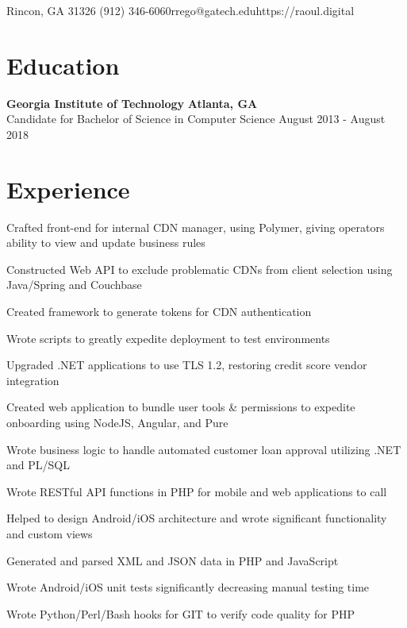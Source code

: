 \documentclass[line]{resume}
\begin{document}
\begin{center}
	 {Rincon, GA 31326} {(912) 346-6060}{rrego@gatech.edu}{https://raoul.digital}
\end{center}
\section{Education}
\textbf{Georgia Institute of Technology} \hfill \textbf{Atlanta, GA} \\
Candidate for Bachelor of Science in Computer Science  \hfill August 2013 - August 2018
\section{Experience}
\begin{myitemize}
	\item Crafted front-end for internal CDN manager, using Polymer, giving operators ability to view and update business rules
	\item Constructed Web API to exclude problematic CDNs from client selection using Java/Spring and Couchbase
	\item Created framework to generate tokens for CDN authentication
\end{myitemize}

\begin{myitemize}
	\item Wrote scripts to greatly expedite deployment to test environments
	\item Upgraded .NET applications to use TLS 1.2, restoring credit score vendor integration
	\item Created web application to bundle user tools \& permissions to expedite onboarding using NodeJS, Angular, and Pure
	\item Wrote business logic to handle automated customer loan approval utilizing .NET and PL/SQL
\end{myitemize}

\begin{myitemize}
	\item Wrote RESTful API functions in PHP for mobile and web applications to call 
	\item Helped to design Android/iOS architecture and wrote significant functionality and custom views
	\item Generated and parsed XML and JSON data in PHP and JavaScript 
	\item Wrote Android/iOS unit tests significantly decreasing manual testing time 
	\item Wrote Python/Perl/Bash hooks for GIT to verify code quality for PHP
\end{myitemize}
\end{document}
